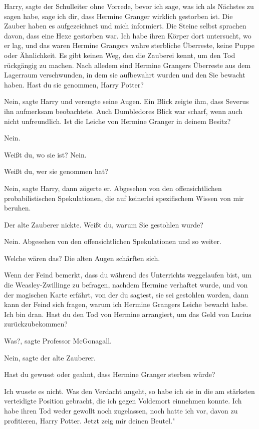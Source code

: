 \glqq{}Harry\grqq{}, sagte der Schulleiter ohne Vorrede, \glqq{}bevor ich sage,
was ich als Nächstes zu sagen habe, sage ich dir, dass Hermine Granger wirklich
gestorben ist. Die Zauber haben es aufgezeichnet und mich informiert. Die Steine
selbst sprachen davon, dass eine Hexe gestorben war. Ich habe ihren Körper dort
untersucht, wo er lag, und das waren Hermine Grangers wahre sterbliche
Überreste, keine Puppe oder Ähnlichkeit. Es gibt keinen Weg, den die Zauberei
kennt, um den Tod rückgängig zu machen. Nach alledem sind Hermine Grangers
Überreste aus dem Lagerraum verschwunden, in dem sie aufbewahrt wurden und den
Sie bewacht haben. Hast du sie genommen, Harry Potter?\grqq{}

\glqq{}Nein\grqq{}, sagte Harry und verengte seine Augen. Ein Blick zeigte ihm,
dass Severus ihn aufmerksam beobachtete. Auch Dumbledores Blick war scharf, wenn
auch nicht unfreundlich. \glqq{}Ist die Leiche von Hermine Granger in deinem
Besitz?\grqq{}

\glqq{}Nein.\grqq{}

\glqq{}Weißt du, wo sie ist?\grqq{} \glqq{}Nein.\grqq{}

\glqq{} Weißt du, wer sie genommen hat?\grqq{}

\glqq{}Nein\grqq{}, sagte Harry, dann zögerte er. \glqq{}Abgesehen von den
offensichtlichen probabilistischen Spekulationen, die auf keinerlei spezifischem
Wissen von mir beruhen.\grqq{}

Der alte Zauberer nickte. \glqq{} Weißt du, warum Sie gestohlen wurde?\grqq{}

\glqq{}Nein. Abgesehen von den offensichtlichen Spekulationen und so
weiter.\grqq{}

\glqq{}Welche wären das?\grqq{} Die alten Augen schärften sich.

\glqq{}Wenn der Feind bemerkt, dass du während des Unterrichts weggelaufen bist,
um die Weasley-Zwillinge zu befragen, nachdem Hermine verhaftet wurde, und von
der magischen Karte erfährt, von der du sagtest, sie sei gestohlen worden, dann
kann der Feind sich fragen, warum ich Hermine Grangers Leiche bewacht habe. Ich
bin dran. Hast du den Tod von Hermine arrangiert, um das Geld von Lucius
zurückzubekommen?\grqq{}

\glqq{}Was?\grqq{}, sagte Professor McGonagall.

\glqq{}Nein\grqq{}, sagte der alte Zauberer.

\glqq{}Hast du gewusst oder geahnt, dass Hermine Granger sterben würde?\grqq{}

\glqq{}Ich wusste es nicht. Was den Verdacht angeht, so habe ich sie in die am
stärksten verteidigte Position gebracht, die ich gegen Voldemort einnehmen
konnte. Ich habe ihren Tod weder gewollt noch zugelassen, noch hatte ich vor,
davon zu profitieren, Harry Potter. Jetzt zeig mir deinen Beutel."


